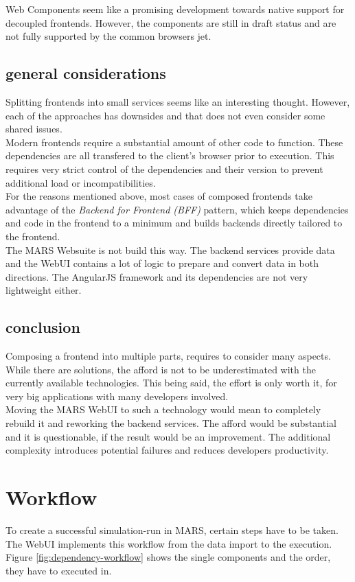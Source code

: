 Web Components seem like a promising development towards native support for decoupled frontends. However, the components are still in draft status and are not fully supported by the common browsers jet.


\subsection{general considerations}
Splitting frontends into small services seems like an interesting thought. However, each of the approaches has downsides and that does not even consider some shared issues.\\
Modern frontends require a substantial amount of other code to function. These dependencies are all transfered to the client's browser prior to execution. This requires very strict control of the dependencies and their version to prevent additional load or incompatibilities.\\
For the reasons mentioned above, most cases of composed frontends take advantage of the \textit{Backend for Frontend (BFF)} pattern, which keeps dependencies and code in the frontend to a minimum and builds backends directly tailored to the frontend.\\
The MARS Websuite is not build this way. The backend services provide data and the WebUI contains a lot of logic to prepare and convert data in both directions. The AngularJS framework and its dependencies are not very lightweight either.\\


\subsection{conclusion}
Composing a frontend into multiple parts, requires to consider many aspects. While there are solutions, the afford is not to be underestimated with the currently available technologies. This being said, the effort is only worth it, for very big applications with many developers involved.\\
Moving the MARS WebUI to such a technology would mean to completely rebuild it and reworking the backend services. The afford would be substantial and it is questionable, if the result would be an improvement. The additional complexity introduces potential failures and reduces developers productivity.



\section{Workflow}
To create a successful simulation-run in MARS, certain steps have to be taken. The WebUI implements this workflow from the data import to the execution. Figure \ref{fig:dependency-workflow} shows the single components and the order, they have to executed in.

